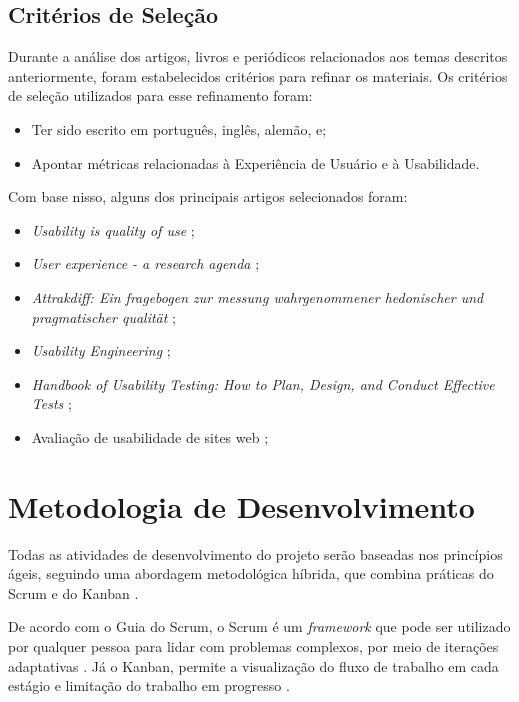 \subsection{Critérios de Seleção}
\label{sec:Critérios de Selecao}
Durante a análise dos artigos, livros e periódicos relacionados aos temas descritos anteriormente, foram estabelecidos critérios para refinar os materiais. Os critérios de seleção utilizados para esse refinamento foram:

\begin{itemize}
	\item Ter sido escrito em português, inglês, alemão, e;
	\item Apontar métricas relacionadas à Experiência de Usuário e à Usabilidade.
\end{itemize}

Com base nisso, alguns dos principais artigos selecionados foram:

\begin{itemize}
	\item \textit{Usability is quality of use} \cite{bevan1995};
	\item \textit{User experience - a research agenda} \cite{hassenzahl2006};
	\item \textit{Attrakdiff: Ein fragebogen zur messung wahrgenommener hedonischer und pragmatischer qualität} \cite{hassenzahl2003};
	\item \textit{Usability Engineering} \cite{nielsen1994usability};
	\item \textit{Handbook of Usability Testing: How to Plan, Design, and Conduct Effective Tests} \cite{rubin2011};
	\item Avaliação de usabilidade de sites web \cite{winckler2022};
\end{itemize}

\section{Metodologia de Desenvolvimento}
\label{sec:Metodologia de Desenvolvimento}
Todas as atividades de desenvolvimento do projeto serão baseadas nos princípios ágeis, seguindo uma abordagem metodológica híbrida, que combina práticas do Scrum e do Kanban \cite{totvs2021} \cite{scrumguide2020}. 

De acordo com o Guia do Scrum, o Scrum é um \textit{framework} que pode ser utilizado por qualquer pessoa para lidar com problemas complexos, por meio de iterações adaptativas \cite{scrumguide2020}. Já o Kanban, permite 
a visualização do fluxo de trabalho em cada estágio e limitação do trabalho em progresso \cite{anderson2011}.


